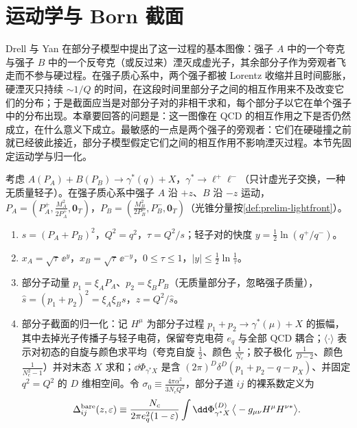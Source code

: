 \section{运动学与 Born 截面}\label{sec:dy-born}

Drell 与 Yan 在部分子模型中提出了这一过程的基本图像\cite{DrellYan1970}：强子 $A$ 中的一个夸克与强子 $B$ 中的一个反夸克（或反过来）湮灭成虚光子，其余部分子作为旁观者飞走而不参与硬过程。在强子质心系中，两个强子都被 Lorentz 收缩并且时间膨胀，硬湮灭只持续 $\sim1/Q$ 的时间，在这段时间里部分子之间的相互作用来不及改变它们的分布；于是截面应当是对部分子对的非相干求和，每个部分子以它在单个强子中的分布出现。本章要回答的问题是：这一图像在 QCD 的相互作用之下是否仍然成立，在什么意义下成立。最敏感的一点是两个强子的旁观者：它们在硬碰撞之前就已经彼此接近，部分子模型假定它们之间的相互作用不影响湮灭过程。本节先固定运动学与归一化。

\begin{definition}[DY 运动学]\label{def:dy-kin}
考虑 $A(P_A)+B(P_B)\to\gamma^*(q)+X$，$\gamma^*\to\ell^+\ell^-$（只计虚光子交换，一种无质量轻子）。在强子质心系中强子 $A$ 沿 $+z$、$B$ 沿 $-z$ 运动，
$P_A=(P_A^+,\frac{M_A^2}{2P_A^+},\mathbf 0_T)$，$P_B=(\frac{M_B^2}{2P_B^-},P_B^-,\mathbf 0_T)$（光锥分量按\cref{def:prelim-lightfront}）。
\begin{enumerate}[label=(\roman*),leftmargin=2.2em,itemsep=1pt,topsep=2pt]
\item $s=(P_A+P_B)^2$，$Q^2=q^2$，$\tau=Q^2/s$；轻子对的快度 $y=\frac12\ln(q^+/q^-)$。
\item $x_A=\sqrt\tau\,\ee^{y}$，$x_B=\sqrt\tau\,\ee^{-y}$，$0\le\tau\le1$，$|y|\le\frac12\ln\frac1\tau$。
\item 部分子动量 $p_1=\xi_AP_A$、$p_2=\xi_BP_B$（无质量部分子，忽略强子质量），$\hat s=(p_1+p_2)^2=\xi_A\xi_Bs$，$z=Q^2/\hat s$。
\item 部分子截面的归一化：记 $H^\mu$ 为部分子过程 $p_1+p_2\to\gamma^*(\mu)+X$ 的振幅，其中去掉光子传播子与轻子电荷，保留夸克电荷 $e_q$ 与全部 QCD 耦合；$\langle\cdot\rangle$ 表示对初态的自旋与颜色求平均（夸克自旋 $\frac12$、颜色 $\frac1{N_c}$；胶子极化 $\frac{1}{D-2}$、颜色 $\frac1{N_c^2-1}$）并对末态 $X$ 求和；$\dd\Phi_{\gamma^*X}$ 是含 $(2\pi)^D\delta^D(p_1+p_2-q-p_X)$、并固定 $q^2=Q^2$ 的 $D$ 维相空间。令 $\sigma_0\equiv\frac{4\pi\alpha^2}{3N_cQ^2}$，部分子道 $ij$ 的裸系数定义为
\begin{equation}\label{eq:dy-bare}
\Delta^{\rm bare}_{ij}(z,\varepsilon)\equiv\frac{N_c}{2\pi e_q^2(1-\varepsilon)}\int\dd\Phi^{(D)}_{\gamma^*X}\,\big\langle-g_{\mu\nu}H^\mu H^{\nu*}\big\rangle .
\end{equation}
\end{enumerate}
\end{definition}

